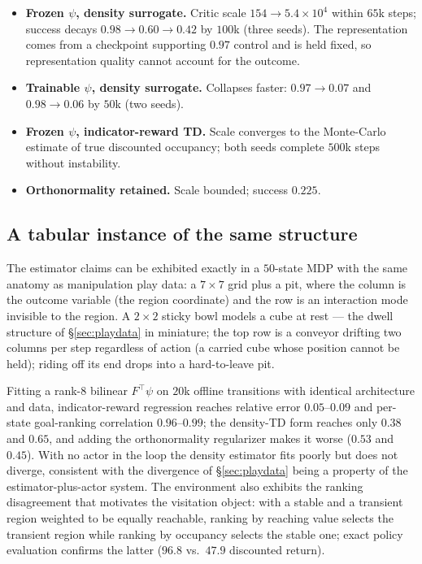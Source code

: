 \documentclass{article}
\begin{document}
\begin{itemize}
\item \textbf{Frozen $\psi$, density surrogate.} Critic scale
$154\to5.4\times10^{4}$ within $65$k steps; success decays
$0.98\to0.60\to0.42$ by $100$k (three seeds). The representation comes from a
checkpoint supporting $0.97$ control and is held fixed, so representation
quality cannot account for the outcome.
\item \textbf{Trainable $\psi$, density surrogate.} Collapses faster:
$0.97\to0.07$ and $0.98\to0.06$ by $50$k (two seeds).
\item \textbf{Frozen $\psi$, indicator-reward TD.} Scale converges to the
Monte-Carlo estimate of true discounted occupancy; both seeds complete $500$k
steps without instability.
\item \textbf{Orthonormality retained.} Scale bounded; success $0.225$.
\end{itemize}

\subsection{A tabular instance of the same structure}
\label{app:playpen}

The estimator claims can be exhibited exactly in a $50$-state MDP with the same
anatomy as manipulation play data: a $7\times7$ grid plus a pit, where the
column is the outcome variable (the region coordinate) and the row is an
interaction mode invisible to the region. A $2\times2$ sticky bowl models a
cube at rest --- the dwell structure of \S\ref{sec:playdata} in miniature; the
top row is a conveyor drifting two columns per step regardless of action (a
carried cube whose position cannot be held); riding off its end drops into a
hard-to-leave pit.

Fitting a rank-$8$ bilinear $F^{\top}\psi$ on $20$k offline transitions with
identical architecture and data, indicator-reward regression reaches relative
error $0.05$--$0.09$ and per-state goal-ranking correlation $0.96$--$0.99$; the
density-TD form reaches only $0.38$ and $0.65$, and adding the orthonormality
regularizer makes it worse ($0.53$ and $0.45$). With no actor in the loop the
density estimator fits poorly but does not diverge, consistent with the
divergence of \S\ref{sec:playdata} being a property of the
estimator-plus-actor system. The environment also exhibits the ranking
disagreement that motivates the visitation object: with a stable and a
transient region weighted to be equally reachable, ranking by reaching value
selects the transient region while ranking by occupancy selects the stable
one; exact policy evaluation confirms the latter ($96.8$ vs.\ $47.9$
discounted return).
\end{document}
